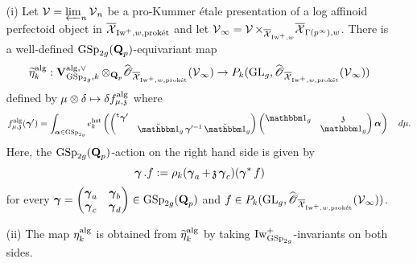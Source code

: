 \begin{Lemma}
\begin{enumerate}
\item[(i)] Let $\calV = \varprojlim_n \calV_n$ be a pro-Kummer \'etale presentation of a log affinoid perfectoid object in $\overline{\calX}_{\Iw^+, w, \proket}$ and let $\calV_{\infty} = \calV\times_{\overline{\calX}_{\Iw^+, w}}\overline{\calX}_{\Gamma(p^{\infty}), w}$. There is a well-defined $\GSp_{2g}(\Q_p)$-equivariant map
$$
\widetilde{\eta}_k^{\alg}: \V_{\GSp_{2g}, k}^{\alg, \vee} \otimes_{\Q_p} \widehat{\scrO}_{\overline{\calX}_{\Iw^+, w, \proket}}(\calV_{\infty})\rightarrow P_k(\GL_g, \widehat{\scrO}_{\overline{\calX}_{\Iw^+, w, \proket}}(\calV_{\infty}))
$$
defined by $\mu\otimes\delta \mapsto \delta f_{\mu, \frakz}^{\alg}$ where 
$$ f_{\mu, \frakz}^{\alg}(\bfgamma')=\int_{\bfalpha\in \GSp_{2g}} e_{k}^{\hst}\left(\begin{pmatrix}\trans\bfgamma' & \\ & \oneanti_g \bfgamma'^{-1}\oneanti_g\end{pmatrix}\begin{pmatrix}\one_g & \frakz\\ & \one_g\end{pmatrix} \bfalpha\right)\quad d\mu.$$
Here, the $\GSp_{2g}(\Q_p)$-action on the right hand side is given by
$$
\bfgamma.f:=\rho_k(\bfgamma_a+\frakz\bfgamma_c)(\bfgamma^*f)
$$
for every $\bfgamma=\begin{pmatrix} \bfgamma_a & \bfgamma_b\\ \bfgamma_c & \bfgamma_d\end{pmatrix}\in \GSp_{2g}(\Q_p)$ and $f\in P_k(\GL_g, \widehat{\scrO}_{\overline{\calX}_{\Iw^+, w, \proket}}(\calV_{\infty}))$.
\item[(ii)] The map $\eta_k^{\alg}$ is obtained from $\widetilde{\eta}^{\alg}_k$ by taking $\Iw^+_{\GSp_{2g}}$-invariants on both sides.
\end{enumerate}
\end{Lemma}

